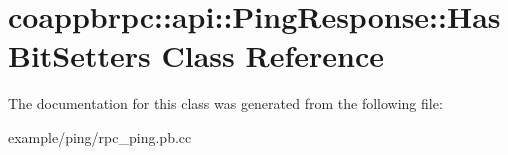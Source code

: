 \hypertarget{classcoappbrpc_1_1api_1_1PingResponse_1_1HasBitSetters}{}\section{coappbrpc\+:\+:api\+:\+:Ping\+Response\+:\+:Has\+Bit\+Setters Class Reference}
\label{classcoappbrpc_1_1api_1_1PingResponse_1_1HasBitSetters}


The documentation for this class was generated from the following file\+:\begin{DoxyCompactItemize}
\item 
example/ping/rpc\+\_\+ping.\+pb.\+cc\end{DoxyCompactItemize}
